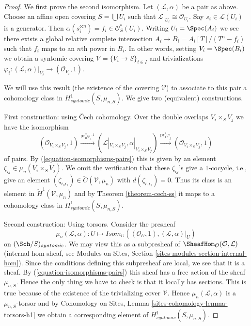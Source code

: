 \begin{proof}
We first prove the second isomorphism.
Let $(\mathcal{L}, \alpha)$ be a pair as above.
Choose an affine open covering $S = \bigcup U_i$ such that
$\mathcal{L}|_{U_i} \cong \mathcal{O}_{U_i}$. Say $s_i \in \mathcal{L}(U_i)$
is a generator. Then $\alpha(s_i^{\otimes n}) = f_i \in \mathcal{O}_S^*(U_i)$.
Writing $U_i = \Spec(A_i)$ we see there exists a global
relative complete intersection $A_i \to B_i = A_i[T]/(T^n - f_i)$
such that $f_i$ maps to an $n$th power in $B_i$. In other words, setting
$V_i = \Spec(B_i)$ we obtain a syntomic covering
$\mathcal{V} = \{V_i \to S\}_{i \in I}$ and trivializations
$\varphi_i : (\mathcal{L}, \alpha)|_{V_i} \to (\mathcal{O}_{V_i}, 1)$.

\medskip\noindent
We will use this result (the existence of the covering $\mathcal{V}$)
to associate to this pair a cohomology class in
$H^1_{syntomic}(S, \mu_{n, S})$. We give two (equivalent) constructions.

\medskip\noindent
First construction: using {\v C}ech cohomology.
Over the double overlaps $V_i \times_S V_j$ we have the isomorphism
$$
(\mathcal{O}_{V_i \times_S V_j}, 1)
\xrightarrow{\text{pr}_0^*\varphi_i^{-1}}
(\mathcal{L}|_{V_i \times_S V_j}, \alpha|_{V_i \times_S V_j})
\xrightarrow{\text{pr}_1^*\varphi_j}
(\mathcal{O}_{V_i \times_S V_j}, 1)
$$
of pairs. By (\ref{equation-isomorphisms-pairs}) this is given by an
element $\zeta_{ij} \in \mu_n(V_i \times_S V_j)$. We omit the verification
that these $\zeta_{ij}$'s give a $1$-cocycle, i.e., give
an element $(\zeta_{i_0i_1}) \in \check C(\mathcal{V}, \mu_n)$
with $d(\zeta_{i_0i_1}) = 0$. Thus its class is an element in
$\check H^1(\mathcal{V}, \mu_n)$ and by
Theorem \ref{theorem-cech-ss}
it maps to a cohomology class in $H^1_{syntomic}(S, \mu_{n, S})$.

\medskip\noindent
Second construction: Using torsors. Consider the presheaf
$$
\mu_n(\mathcal{L}, \alpha) :
U
\longmapsto
\mathit{Isom}_U((\mathcal{O}_U, 1), (\mathcal{L}, \alpha)|_U)
$$
on $(\Sch/S)_{syntomic}$.
We may view this as a subpresheaf of
$\SheafHom_\mathcal{O}(\mathcal{O}, \mathcal{L})$ (internal hom
sheaf, see
Modules on Sites, Section \ref{sites-modules-section-internal-hom}).
Since the conditions defining this subpresheaf are local, we see that it is
a sheaf.
By (\ref{equation-isomorphisms-pairs}) this sheaf has a free action of
the sheaf $\mu_{n, S}$. Hence the only thing we have to check is that
it locally has sections. This is true because of the existence of the
trivializing cover $\mathcal{V}$. Hence $\mu_n(\mathcal{L}, \alpha)$
is a $\mu_{n, S}$-torsor and by
Cohomology on Sites, Lemma \ref{sites-cohomology-lemma-torsors-h1}
we obtain a corresponding element of $H^1_{syntomic}(S, \mu_{n, S})$.


\end{proof}
